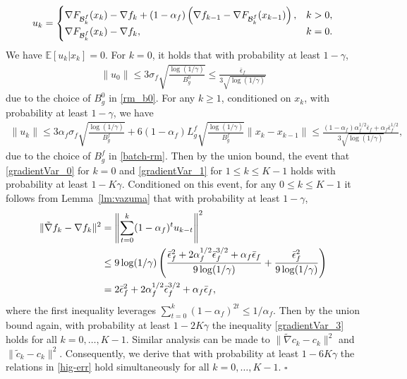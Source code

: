 \documentclass[10pt,a4paper]{amsart}
\newenvironment{proof}{{\noindent\it Proof.}\quad}{\hfill $\square$\par}
\begin{document}
\begin{proof}
    \begin{align}  
        u_k = \begin{cases}  
         \nabla F_{\mathcal{B}_k^f}(x_k) - \nabla f_k + (1 - \alpha_f) \left( \nabla f_{k-1} - \nabla F_{\mathcal{B}_k^f}(x_{k-1}) \right), & k > 0, \\ 
         \nabla F_{\mathcal{B}_k^f}(x_k) - \nabla f_k, & k = 0.
        \end{cases}\notag  
    \end{align}  
    We have $\mathbb{E}[u_k | x_k] = 0$. 
    For $k = 0$, it holds that with probability at least $1 - \gamma$,  
    \begin{align}  
        \|u_0\| \leq 3 \sigma_f \sqrt{\frac{\log(1/\gamma)}{B_g^0}} \leq \frac{\bar \epsilon_f}{3\sqrt{ \log(1/\gamma)} }\label{gradientVar_1}  
    \end{align}  
    due to the choice of $B_g^0$ in \eqref{rm_b0}.  
    For any $k \ge 1$, conditioned on $x_k$, with probability at least $1 - \gamma$,  we have
    \begin{align}  
        \|u_k\| \leq 3 \alpha_f \sigma_f \sqrt{\frac{\log(1/\gamma)}{B_g^f}} + 6 (1 - \alpha_f) L_g^f \sqrt{\frac{\log(1/\gamma)}{B_g^f}} \|x_k - x_{k-1}\| \leq \frac{(1 - \alpha_f) \alpha_f^{1/2} \bar \epsilon_f + \alpha_f \bar \epsilon_f^{1/2}}{3\sqrt{ \log(1/\gamma)} },\label{gradientVar_0}  
    \end{align}  
    due to the choice of $B_g^f$ in \eqref{batch-rm}.  
    Then by the union bound, the event that \eqref{gradientVar_0} for $k=0$ and \eqref{gradientVar_1} for $1\le k\le K-1$ holds with probability at least $1 - K \gamma$.  
    Conditioned on this event, for any $0\le k\le K-1$ it follows from  Lemma~\ref{lm:vazuma}   that with probability at least $1 - \gamma$,  
    \begin{align}  
        \|\tilde \nabla f_k - \nabla f_k\|^2 &= \left\| \sum_{t=0}^k (1 - \alpha_f)^t u_{k-t} \right\|^2 \notag \\  
        &\leq 9 \log(1/\gamma) \left( \frac{\bar \epsilon_f^2 + 2 \alpha_f^{1/2} \bar \epsilon_f^{3/2} + \alpha_f \bar \epsilon_f}{9 \log(1/\gamma)} + \frac{\bar \epsilon_f^2}{9\log(1/\gamma)} \right) \notag \\  
        &= 2 \bar \epsilon_f^2 + 2 \alpha_f^{1/2} \bar \epsilon_f^{3/2} + \alpha_f \bar \epsilon_f,\label{gradientVar_3}  
    \end{align}  
    where the first inequality leverages $\sum_{t=0}^k (1 - \alpha_f)^{2t} \leq 1/\alpha_f$.  
    Then  by the union bound again, with probability at least $1 - 2K \gamma$ the inequality   \eqref{gradientVar_3} holds for all $k=0,\ldots,  K-1$.   %
    Similar analysis can be made to $\|\tilde \nabla c_k-c_k\|^2$ and $\|\tilde c_k - c_k\|^2$. Consequently, we derive that with probability at least $1-6K\gamma$ the relations in \eqref{hig-err} hold simultaneously for all $k=0,\ldots,K-1.$%
\end{proof}
\end{document}
